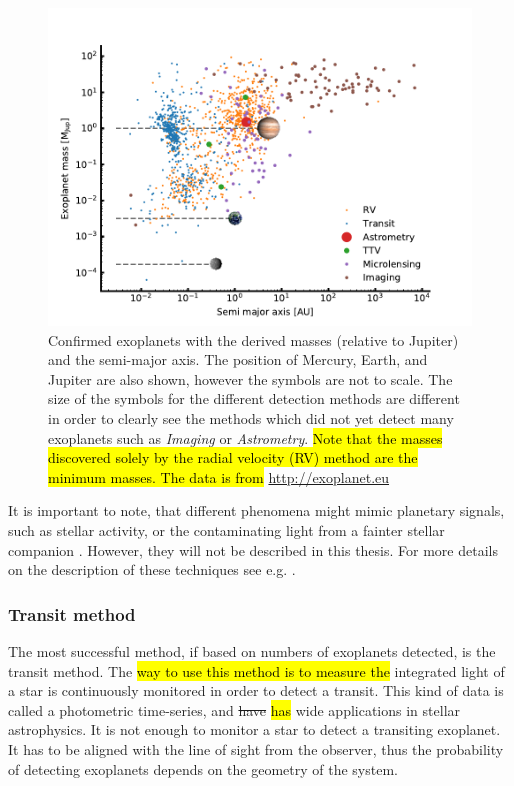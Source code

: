 \begin{figure}[htpb!]
    \centering
    \includegraphics[width=1.0\linewidth]{figures/exoplanetDetectionType.pdf}
    \caption{Confirmed exoplanets with the derived masses (relative to Jupiter) and the semi-major
             axis. The position of Mercury, Earth, and Jupiter are also shown, however the symbols
             are not to scale. The size of the symbols for the different detection methods are
             different in order to clearly see the methods which did not yet detect many exoplanets
             such as \emph{Imaging} or \emph{Astrometry}. \hl{Note that the masses discovered
             solely by the radial velocity (RV) method are the minimum masses. The data is from}
             \url{http://exoplanet.eu}}
    \label{fig:detectionTypes}
\end{figure}

It is important to note, that different phenomena might mimic planetary signals, such as stellar
activity, or the contaminating light from a fainter stellar companion \citep[see
e.g.][]{Queloz2001,Oshagh2013,Oshagh2014}. However, they will not be described in this thesis. For
more details on the description of these techniques see e.g. \citet{Seager2010}.


\subsubsection{Transit method}
\label{sec:transitMethod}

The most successful method, if based on numbers of exoplanets detected, is the transit method. The
\hl{way to use this method is to measure the} integrated light of a star is continuously monitored
in order to detect a transit. This kind of data is called a photometric time-series, and \st{have}
\hl{has} wide applications in stellar astrophysics. It is not enough to monitor a star to detect a
transiting exoplanet. It has to be aligned with the line of sight from the observer, thus the
probability of detecting exoplanets depends on the geometry of the system.

